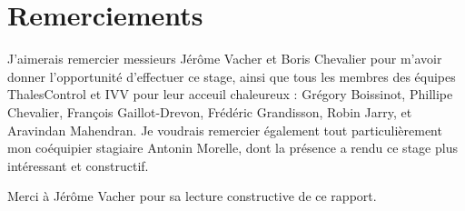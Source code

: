 \section{Remerciements}

J'aimerais remercier messieurs Jérôme Vacher et Boris Chevalier pour m'avoir 
donner l'opportunité d'effectuer ce stage, ainsi que tous les membres des 
équipes ThalesControl et IVV pour leur acceuil chaleureux : Grégory Boissinot, 
Phillipe Chevalier, François Gaillot-Drevon, Frédéric Grandisson, Robin Jarry, 
et Aravindan Mahendran. Je voudrais remercier également tout particulièrement 
mon coéquipier stagiaire Antonin Morelle, dont la présence a rendu ce stage 
plus intéressant et constructif.

Merci à Jérôme Vacher pour sa lecture constructive de ce rapport.